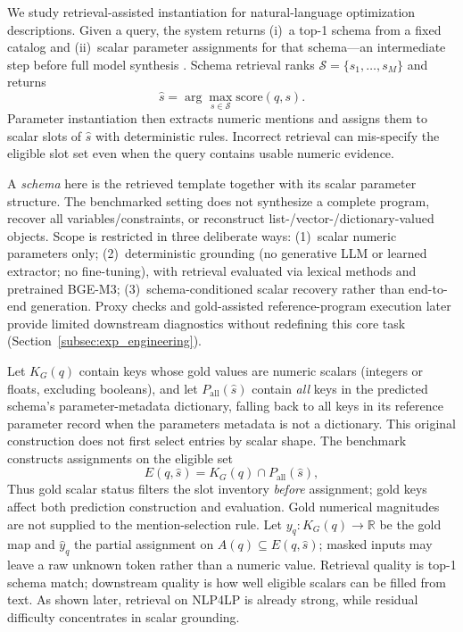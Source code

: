 \documentclass[pdflatex,sn-basic,Numbered]{sn-jnl}
\begin{document}
We study retrieval-assisted instantiation for natural-language optimization descriptions. Given a query, the system returns (i)~a top-1 schema from a fixed catalog and (ii)~scalar parameter assignments for that schema---an intermediate step before full model synthesis \cite{nlp4lp_dataset,ramamonjison2023nl4opt,ahmaditeshnizi2024optimus_icml}. Schema retrieval ranks $\mathcal{S}=\{s_1,\dots,s_M\}$ and returns
\begin{equation}
\hat{s}=\arg\max_{s \in \mathcal{S}} \mathrm{score}(q,s).
\label{eq:top1_schema}
\end{equation}
Parameter instantiation then extracts numeric mentions and assigns them to scalar slots of $\hat{s}$ with deterministic rules. Incorrect retrieval can mis-specify the eligible slot set even when the query contains usable numeric evidence.

A \emph{schema} here is the retrieved template together with its scalar parameter structure. The benchmarked setting does not synthesize a complete program, recover all variables/constraints, or reconstruct list-/vector-/dictionary-valued objects. Scope is restricted in three deliberate ways: (1)~scalar numeric parameters only; (2)~deterministic grounding (no generative LLM or learned extractor; no fine-tuning), with retrieval evaluated via lexical methods and pretrained BGE-M3; (3)~schema-conditioned scalar recovery rather than end-to-end generation. Proxy checks and gold-assisted reference-program execution later provide limited downstream diagnostics without redefining this core task (Section~\ref{subsec:exp_engineering}).

Let $K_G(q)$ contain keys whose gold values are numeric scalars (integers or floats, excluding booleans), and let $P_{\mathrm{all}}(\hat{s})$ contain \emph{all} keys in the predicted schema's parameter-metadata dictionary, falling back to all keys in its reference parameter record when the parameters metadata is not a dictionary. This original construction does not first select entries by scalar shape. The benchmark constructs assignments on the eligible set
\begin{equation}
E(q,\hat{s}) = K_G(q) \cap P_{\mathrm{all}}(\hat{s}),
\label{eq:eligible_slots}
\end{equation}
Thus gold scalar status filters the slot inventory \emph{before} assignment; gold keys affect both prediction construction and evaluation. Gold numerical magnitudes are not supplied to the mention-selection rule. Let $y_q : K_G(q) \to \mathbb{R}$ be the gold map and $\hat{y}_{q}$ the partial assignment on $A(q) \subseteq E(q,\hat{s})$; masked inputs may leave a raw unknown token rather than a numeric value. Retrieval quality is top-1 schema match; downstream quality is how well eligible scalars can be filled from text. As shown later, retrieval on \textsc{NLP4LP} is already strong, while residual difficulty concentrates in scalar grounding.
\end{document}
